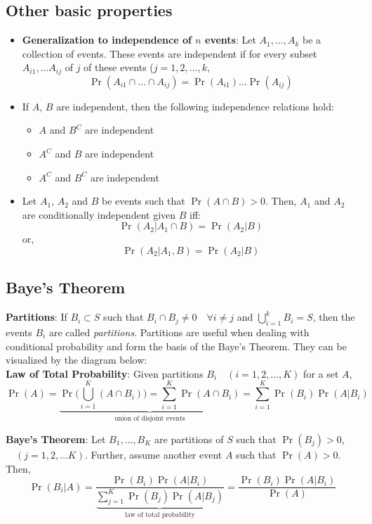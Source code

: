 \documentclass[english, 11pt]{article}
\begin{document}
\subsection{Other basic properties}
\begin{itemize}
\item {\bf Generalization to independence of $n$ events}: Let $A_1, \ldots, A_k$ be a collection of events. These events are independent if for every subset $A_{i1}, \ldots A_{ij}$ of $j$ of these events ($j=1, 2, \ldots, k$,
\[ \Pr(A_{i1} \cap \ldots \cap A_{ij}) = \Pr(A_{i1}) \ldots \Pr(A_{ij}) \]

\item If $A$, $B$ are independent, then the following independence relations hold:
\begin{itemize}
\item $A$ and $B^C$ are independent
\item $A^C$ and $B$ are independent
\item $A^C$ and $B^C$ are independent
\end{itemize}
\item Let $A_1$, $A_2$ and $B$ be events such that $\Pr(A \cap B) > 0$. Then, $A_1$ and $A_2$ are conditionally independent given $B$ iff:
\[ \Pr(A_2 | {A_1 \cap B}) = \Pr(A_2 | B) \]
or, 
\[ \Pr(A_2 | {A_1, B}) = \Pr(A_2 | B) \]

\end{itemize}

\subsection{Baye's Theorem}
{\bf Partitions}: If $B_i \subset S$ such that $B_i \cap B_j \neq 0 \quad \forall i \neq j$ and $\bigcup_{i=1}^k B_i = S$, then the events $B_i$ are called {\it partitions}. Partitions are useful when dealing with conditional probability and form the basis of the Baye's Theorem. They can be visualized by the diagram below: \\

{\bf Law of Total Probability}: Given partitions $B_i \quad (i=1, 2, \ldots, K)$ for a set $A$, 
\[ \Pr(A) = \underbrace{\Pr \bigg( \bigcup_{i=1}^K (A \cap B_i) \bigg) = \sum_{i=1}^K \Pr(A \cap B_i)}_{\text{union of disjoint events}} = \sum_{i=1}^K \Pr(B_i) \Pr(A | B_i) \]

{\bf Baye's Theorem}: Let $B_1, \ldots, B_K$ are partitions of $S$ such that $\Pr(B_j) > 0$, $\quad (j=1, 2, \ldots K)$. Further, assume another event $A$ such that $\Pr(A) > 0$. Then,
\[ \Pr(B_i | A)  = \frac{\Pr(B_i) \Pr(A | B_i)}{\underbrace{\sum_{j=1}^{K} \Pr(B_j) \Pr(A | B_j)}_{\text{law of total probability}} } = \frac{\Pr(B_i) \Pr(A | B_i)}{\Pr(A) } \]
\end{document}
